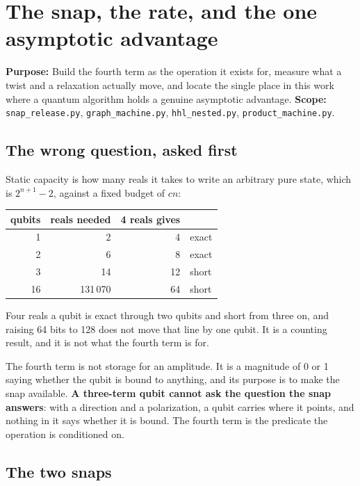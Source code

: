 
\chapter{The snap, the rate, and the one asymptotic advantage}

\textbf{Purpose:} Build the fourth term as the operation it exists for, measure what a twist and a
relaxation actually move, and locate the single place in this work where a quantum algorithm holds a
genuine asymptotic advantage. \textbf{Scope:} \texttt{snap\_release.py},
\texttt{graph\_machine.py}, \texttt{hhl\_nested.py}, \texttt{product\_machine.py}.

\section{The wrong question, asked first}

Static capacity is how many reals it takes to write an arbitrary pure state, which is
\(2^{n+1} - 2\), against a fixed budget of \(cn\):

\begin{center}
\begin{tabular}{rrrl}
\toprule
qubits & reals needed & 4 reals gives & \\
\midrule
1 & 2 & 4 & exact \\
2 & 6 & 8 & exact \\
3 & 14 & 12 & short \\
16 & 131\,070 & 64 & short \\
\bottomrule
\end{tabular}
\end{center}

Four reals a qubit is exact through two qubits and short from three on, and raising 64 bits to 128
does not move that line by one qubit. It is a counting result, and it is not what the fourth term is
for.

The fourth term is not storage for an amplitude. It is a magnitude of 0 or 1 saying whether the qubit
is bound to anything, and its purpose is to make the snap available. \textbf{A three-term qubit
cannot ask the question the snap answers}: with a direction and a polarization, a qubit carries where
it points, and nothing in it says whether it is bound. The fourth term is the predicate the operation
is conditioned on.

\section{The two snaps}

